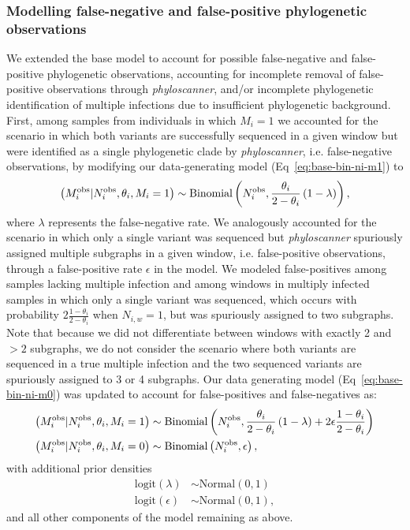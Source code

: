 \documentclass[10pt,letterpaper]{article}
\newcommand{\MI}{M^{\text{\text{obs}}}}
\begin{document}
\subsubsection{Modelling false-negative and false-positive phylogenetic observations}
\label{sec:full_model}
We extended the base model to account for possible false-negative and false-positive phylogenetic observations, accounting for incomplete removal of false-positive observations through \textit{phyloscanner}, and/or incomplete phylogenetic identification of multiple infections due to insufficient phylogenetic background. First, among samples from individuals in which $M_i = 1$ we accounted for the scenario in which both variants are successfully sequenced in a given window but were identified as a single phylogenetic clade by \textit{phyloscanner}, i.e. false-negative observations, by modifying our data-generating model (Eq~\ref{eq:base-bin-ni-m1}) to
\begin{equation}
\left(\MI_i|N^{\text{obs}}_i, \theta_i, M_i = 1\right) \sim \text{Binomial}\left(N^{\text{obs}}_i, \frac{\theta_i}{2-\theta_i}\left(1-\lambda\right)\right),
\end{equation}
where $\lambda$ represents the false-negative rate.
We analogously accounted for the scenario in which only a single variant was sequenced but \textit{phyloscanner} spuriously assigned multiple subgraphs in a given window, i.e. false-positive observations, through a false-positive rate  $\epsilon$ in the model. We modeled false-positives among samples lacking multiple infection and among windows in multiply infected samples in which only a single variant was sequenced, which occurs with probability $2\frac{1-\theta_i}{2-\theta_i}$ when $N_{i,w} = 1$, but was spuriously assigned to two subgraphs. Note that because we did not differentiate between windows with exactly 2 and $>2$ subgraphs, we do not consider the scenario where both variants are sequenced in a true multiple infection and the two sequenced variants are spuriously assigned to 3 or 4 subgraphs. Our data generating model (Eq~\ref{eq:base-bin-ni-m0}) was updated to account for false-positives and false-negatives as:
\begin{subequations}
 \label{eq:full_model_mi_distribution}
 \begin{align}
  \left(\MI_i|N^{\text{obs}}_i, \theta_i, M_i = 1\right) &\sim \text{Binomial}\left(N^{\text{obs}}_i, \frac{\theta_i}{2-\theta_i}\left(1-\lambda\right) + 2\epsilon\frac{1-\theta_i}{2-\theta_i} \right) \\
  \left(\MI_i|N^{\text{obs}}_i, \theta_i, M_i = 0\right) &\sim \text{Binomial}\left(N^{\text{obs}}_i, \epsilon\right),
 \end{align}
\end{subequations}
with additional prior densities
\begin{subequations}
\begin{align}
\text{logit}(\lambda) &\sim \text{Normal}(0,1) \\
\text{logit}(\epsilon) &\sim \text{Normal}(0,1),
\end{align}
\end{subequations}
and all other components of the model remaining as above.
\end{document}
